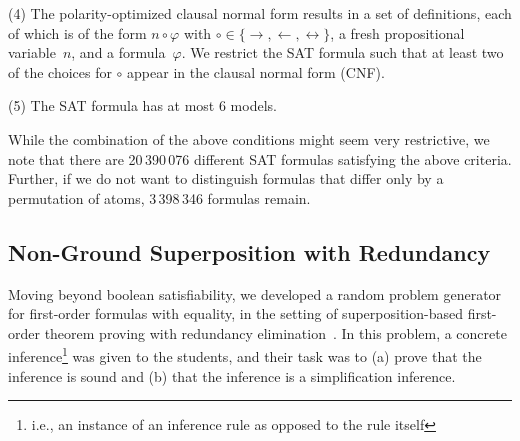 \noindent(4)
        The polarity-optimized clausal normal form results in a set of definitions,
        each of which is of the form
        $n \circ \varphi$ with $\circ \in \{ \rightarrow, \leftarrow, \leftrightarrow \}$,
        a fresh propositional variable~$n$, and a formula~$\varphi$.
        We restrict the SAT formula such that at least two of the choices for
        $\circ$ appear in the clausal normal form (CNF). \smallskip

\noindent(5)
        The SAT formula has at most $6$ models.
        \smallskip


While the combination of the above conditions might seem very restrictive,
we note that 
there are 20\,390\,076 different SAT formulas satisfying the above
criteria.
Further,
if we do not want to distinguish formulas that differ only by a permutation of atoms,
3\,398\,346 formulas remain.





\subsection{Non-Ground Superposition with Redundancy}\label{sec:fo}

Moving beyond boolean satisfiability, we developed a random problem
generator for first-order formulas with equality, in the setting of
superposition-based first-order theorem proving with redundancy elimination~\cite{Rubio01,Vampire13}.
In this problem, a concrete inference\footnote{i.e., an instance of an inference rule as opposed to the rule itself}
was given to the students, and their task was to
(a) prove that the inference is sound
and (b) that the inference is a simplification inference.

